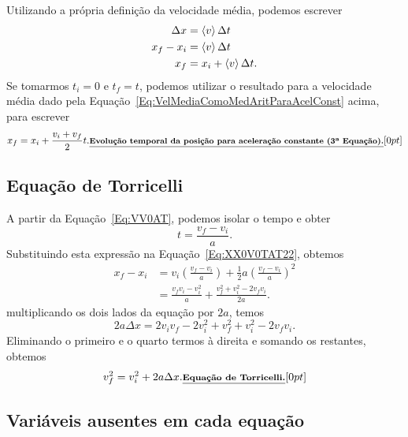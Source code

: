 Utilizando a própria definição da velocidade média, podemos escrever
\begin{align}
    \Delta x &= \left\langle{v}\right\rangle \Delta t \\
    x_f - x_i &= \left\langle{v}\right\rangle \Delta t \\
    x_f &= x_i + \left\langle{v}\right\rangle \Delta t.
\end{align}
%
Se tomarmos $t_i = 0$ e $t_f = t$, podemos utilizar o resultado para a velocidade média dado pela Equação~\eqref{Eq:VelMediaComoMedAritParaAcelConst} acima, para escrever
\begin{equation}
  x_f = x_i + \frac{v_i + v_f}{2} t.\mathnote{Evolução temporal da posição para aceleração constante (3\textordfeminine~Equação).}
\end{equation}

\subsection{Equação de Torricelli}

A partir da Equação~\ref{Eq:VV0AT}, podemos isolar o tempo e obter
\begin{equation}
  t = \frac{v_f-v_i}{a}.
\end{equation}
%
Substituindo esta expressão na Equação~\ref{Eq:XX0V0TAT22}, obtemos
\begin{align}
  x_f - x_i &= v_i \left(\frac{v_f-v_i}{a}\right) + \frac{1}{2} a \left(\frac{v_f-v_i}{a}\right)^2 \\
  &= \frac{v_f v_i - v_i^2}{a} + \frac{v_f^2 + v_i^2-2v_fv_i}{2a}.
\end{align}
%
multiplicando os dois lados da equação por $2a$, temos
\begin{equation}
  2a\Delta x = 2v_i v_f - 2v_i^2 + v_f^2 +v_i^2 - 2v_f v_i.
\end{equation}
%
Eliminando o primeiro e o quarto termos à direita e somando os restantes, obtemos
\begin{equation}
  v_f^2 = v_i^2 + 2 a \Delta x. \relax{\footnotesize\emph{\textbf{Equação de Torricelli.}}}[0pt]
\end{equation}

\subsection{Variáveis ausentes em cada equação}


